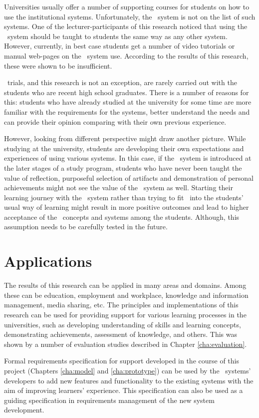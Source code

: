 Universities usually offer a number of supporting courses for students on how to
use the institutional systems. Unfortunately, the \ep~system is not on the list
of such systems. One of the lecturer-participants of this research noticed that
using the \ep~system should be taught to students the same way as any other
system. However, currently, in best case students get a number of video tutorials
or manual web-pages on the \ep~system use. According to the results of this
research, these were shown to be insufficient.

\ep~trials, and this research is not an exception, are rarely carried out with
the students who are recent high school graduates. There is a number of reasons
for this: students who have already studied at the university for some time are
more familiar with the requirements for the systems, better understand the needs
and can provide their opinion comparing with their own previous experience.

However, looking from different perspective might draw another picture. While
studying at the university, students are developing their own expectations and
experiences of using various systems. In this case, if the \ep~system is
introduced at the later stages of a study program, students who have never been
taught the value of reflection, purposeful selection of artifacts and
demonstration of personal achievements might not see the value of the \ep~system
as well. Starting their learning journey with the \ep~system rather than trying
to fit \ep~into the students' usual way of learning might result in more
positive outcomes and lead to higher acceptance of the \ep~concepts and systems
among the students. Although, this assumption needs to be carefully tested in
the future.

\section{Applications}
The results of this research can be applied in many areas and domains. Among
these can be education, employment and workplace, knowledge and information
management, media sharing, etc. The principles and implementations of this
research can be used for providing support for various learning processes in the
universities, such as developing understanding of skills and learning concepts,
demonstrating achievements, assessment of knowledge, and others. This was shown
by a number of evaluation studies described in Chapter \ref{cha:evaluation}.

Formal requirements specification for \LLLs support developed in the course of
this project (Chapters \ref{cha:model} and \ref{cha:prototype}) can be used by
the \ep~systems' developers to add new features and functionality to the
existing systems with the aim of improving learners' experience. This
specification can also be used as a guiding specification in requirements
management of the new system development.

